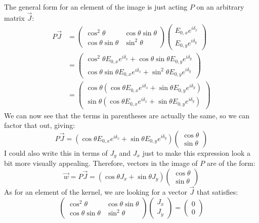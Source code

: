 \documentclass[10pt]{article}
\begin{document}
\begin{enumerate}[label=\alph*)]
\begin{solution}
				The general form for an element of the image is just acting $P$ on an arbitrary matrix
				$\vec J$:
				\begin{align*}
					P \vec J &= \begin{pmatrix} \cos^2 \theta & \cos \theta \sin \theta \\ \cos \theta \sin \theta & \sin^2 \theta \end{pmatrix} \begin{pmatrix} E_{0, x} e^{i \delta_x} \\ E_{0, y} e^{i \delta_y} \end{pmatrix}  \\
							 &= \begin{pmatrix} \cos^2 \theta E_{0, x} e^{i \delta_x} + \cos \theta \sin \theta E_{0, y} e^{i \delta_y} \\ \cos \theta \sin \theta E_{0, x} e^{i \delta_x} + \sin^2 \theta E_{0, y} e^{i \delta_y} \end{pmatrix}  \\
							 &= \begin{pmatrix} \cos \theta(\cos \theta E_{0, x} e^{i \delta_x} + \sin \theta E_{0, y}e^{i \delta_y})\\ \sin \theta (\cos \theta E_{0, x} e^{i \delta_x} + \sin \theta E_{0, y}e^{i \delta_y}) \end{pmatrix}
				\end{align*}
				We can now see that the terms in parentheses are actually the same, so we can factor that out, 
				giving:
				\[
					P \vec J = (\cos \theta E_{0, x} e^{i \delta_x} + \sin \theta E_{0, y} e^{i \delta_y}) 
					\begin{pmatrix}  \cos \theta \\ \sin \theta \end{pmatrix} 
				\] 
				I could also write this in terms of $J_y$ and $J_x$ just to make this expression look a bit more
				visually appealing. Therefore, vectors in the image of $P$ are of the form:
				\[
					\vec w = P \vec J  = (\cos \theta J_x + \sin \theta J_y) \begin{pmatrix}  \cos \theta \\ \sin \theta \end{pmatrix} 
				\] 
				As for an element of the kernel, we are looking for a vector $\vec J$ that satisfies:
				\[
					\begin{pmatrix} \cos^2 \theta & \cos \theta \sin \theta \\ \cos \theta \sin \theta & \sin^2 \theta \end{pmatrix} \begin{pmatrix} J_x \\ J_y \end{pmatrix}  = \begin{pmatrix}  0\\0 \end{pmatrix} 
\]
\end{solution}
\end{enumerate}
\end{document}
